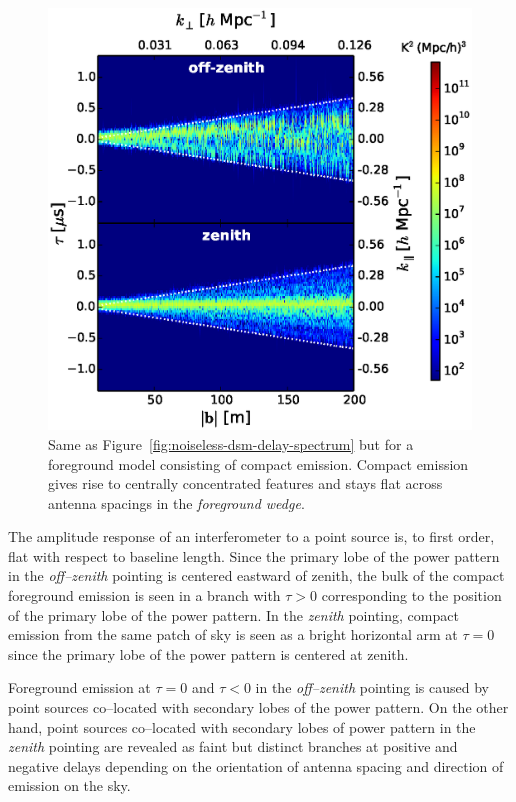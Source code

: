 \documentclass[preprint2,iop,numberedappendix]{emulateapj}
\begin{document}
\begin{figure}[htb]
\centering
\includegraphics[width=\linewidth]{fig9.eps}
\caption{Same as Figure~\ref{fig:noiseless-dsm-delay-spectrum} but for a foreground model consisting of compact emission. Compact emission gives rise to centrally concentrated features and stays flat across antenna spacings in the {\it foreground wedge}.\label{fig:noiseless-csm-delay-spectrum}}
\end{figure}

The amplitude response of an interferometer to a point source is, to first order, flat with respect to baseline length. Since the primary lobe of the power pattern in the {\it off--zenith} pointing is centered eastward of zenith, the bulk of the compact foreground emission is seen in a branch with $\tau>0$ corresponding to the position of the primary lobe of the power pattern. In the {\it zenith} pointing, compact emission from the same patch of sky is seen as a bright horizontal arm at $\tau=0$ since the primary lobe of the power pattern is centered at zenith. 

Foreground emission at $\tau=0$ and $\tau<0$ in the {\it off--zenith} pointing is caused by point sources co--located with secondary lobes of the power pattern. On the other hand, point sources co--located with secondary lobes of power pattern in the {\it zenith} pointing are revealed as faint but distinct branches at positive and negative delays depending on the orientation of antenna spacing and direction of emission on the sky. 
\end{document}

